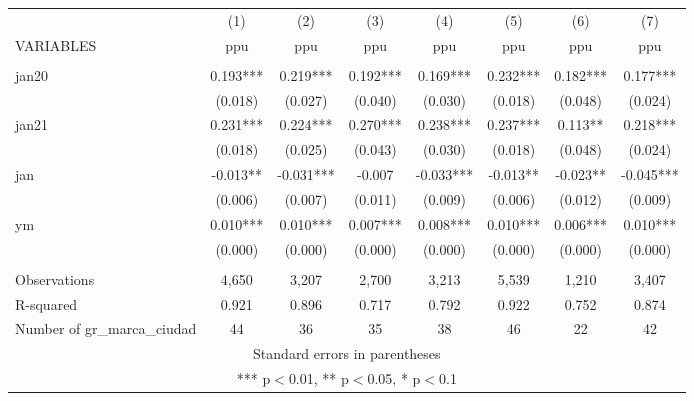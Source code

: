 \begin{tabular}{lccccccc} \hline
 & (1) & (2) & (3) & (4) & (5) & (6) & (7) \\
VARIABLES & ppu & ppu & ppu & ppu & ppu & ppu & ppu \\ \hline
 &  &  &  &  &  &  &  \\
jan20 & 0.193*** & 0.219*** & 0.192*** & 0.169*** & 0.232*** & 0.182*** & 0.177*** \\
 & (0.018) & (0.027) & (0.040) & (0.030) & (0.018) & (0.048) & (0.024) \\
jan21 & 0.231*** & 0.224*** & 0.270*** & 0.238*** & 0.237*** & 0.113** & 0.218*** \\
 & (0.018) & (0.025) & (0.043) & (0.030) & (0.018) & (0.048) & (0.024) \\
jan & -0.013** & -0.031*** & -0.007 & -0.033*** & -0.013** & -0.023** & -0.045*** \\
 & (0.006) & (0.007) & (0.011) & (0.009) & (0.006) & (0.012) & (0.009) \\
ym & 0.010*** & 0.010*** & 0.007*** & 0.008*** & 0.010*** & 0.006*** & 0.010*** \\
 & (0.000) & (0.000) & (0.000) & (0.000) & (0.000) & (0.000) & (0.000) \\
 &  &  &  &  &  &  &  \\
Observations & 4,650 & 3,207 & 2,700 & 3,213 & 5,539 & 1,210 & 3,407 \\
R-squared & 0.921 & 0.896 & 0.717 & 0.792 & 0.922 & 0.752 & 0.874 \\
 Number of gr\_marca\_ciudad & 44 & 36 & 35 & 38 & 46 & 22 & 42 \\ \hline
\multicolumn{8}{c}{ Standard errors in parentheses} \\
\multicolumn{8}{c}{ *** p$<$0.01, ** p$<$0.05, * p$<$0.1} \\
\end{tabular}
